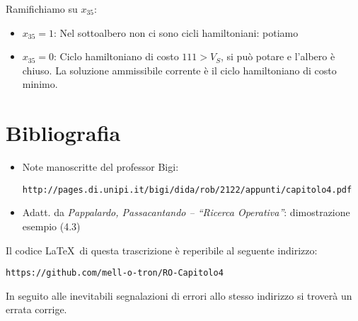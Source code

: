 \documentclass[a4paper,11pt]{book}
\theoremstyle{break}
\begin{document}
Ramifichiamo su $x_{35}$:
\begin{itemize}
 \item $x_{35} = 1$: Nel sottoalbero non ci sono cicli hamiltoniani: potiamo
 \item $x_{35} = 0$: Ciclo hamiltoniano di costo $111>V_S$, si può potare e l'albero è chiuso. La soluzione ammissibile corrente è il ciclo hamiltoniano di costo minimo.
\end{itemize}

  \begin{center}

    \smallskip
    
    
\end{center}

\newpage
\pagestyle{empty}
\section*{Bibliografia}

\begin{itemize}
 \item Note manoscritte del professor Bigi: 
 
 \texttt{http://pages.di.unipi.it/bigi/dida/rob/2122/appunti/capitolo4.pdf}
 
 \item Adatt. da \emph{Pappalardo, Passacantando -- ``Ricerca Operativa''}: dimostrazione esempio (4.3)
\end{itemize}\bigskip

\vspace*{\fill}
Il codice \LaTeX \, di questa trascrizione è reperibile al seguente indirizzo:\medskip


\texttt{https://github.com/mell-o-tron/RO-Capitolo4}\medskip

In seguito alle inevitabili segnalazioni di errori allo stesso indirizzo si troverà un errata corrige.
\end{document}
